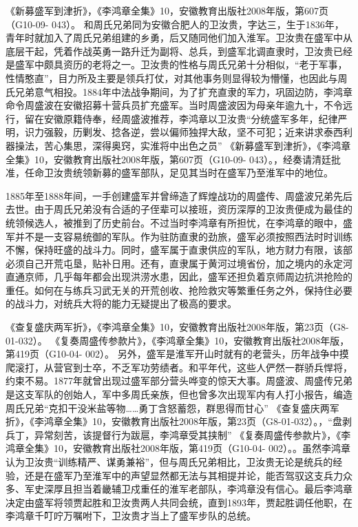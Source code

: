 \documentclass[12pt,UTF8]{ctexbook}
\begin{document}
《新募盛军到津折》，《李鸿章全集》10，安徽教育出版社2008年版，第607页（G10-09- 043）。
和周氏兄弟同为安徽合肥人的卫汝贵，字达三，生于1836年，青年时就加入了周氏兄弟组建的乡勇，后又随同他们加入淮军。卫汝贵在盛军中从底层干起，凭着作战英勇一路升迁为副将、总兵，到盛军北调直隶时，卫汝贵已经是盛军中颇具资历的老将之一。卫汝贵的性格与周氏兄弟十分相似，“老于军事，性情憨直”，目力所及主要是领兵打仗，对其他事务则显得较为懵懂，也因此与周氏兄弟意气相投。1884年中法战争期间，为了扩充直隶的军力，巩固边防，李鸿章命令周盛波在安徽招募十营兵员扩充盛军。当时周盛波因为母亲年逾九十，不令远行，留在安徽原籍侍奉，经周盛波推荐，李鸿章以卫汝贵“分统盛军多年，纪律严明，识力强毅，历剿发、捻各逆，尝以偏师独捍大敌，坚不可犯；近来讲求泰西利器操法，苦心集思，深得奥窍，实淮将中出色之员” 《新募盛军到津折》，《李鸿章全集》10，安徽教育出版社2008年版，第607页（G10-09- 043）。，经奏请清廷批准，任命卫汝贵统领新募的盛军部队，足见其当时在盛军乃至淮军中的地位。

1885年至1888年间，一手创建盛军并曾缔造了辉煌战功的周盛传、周盛波兄弟先后去世。由于周氏兄弟没有合适的子侄辈可以接班，资历深厚的卫汝贵便成为最佳的统领候选人，被推到了历史前台。不过当时李鸿章有所担忧，在李鸿章的眼中，盛军并不是一支容易统御的军队。作为驻防直隶的劲旅，盛军必须按照西法时时训练不懈，保持旺盛的战斗力。同时，盛军属于直隶供应的军队，地方财力有限，该部必须自己开荒屯垦，贴补日用。还有，直隶属于黄河过境省份，加之境内的永定河直通京师，几乎每年都会出现洪涝水患，因此，盛军还担负着京师周边抗洪抢险的重任。如何在与练兵习武无关的开荒创收、抢险救灾等繁重任务之外，保持住必要的战斗力，对统兵大将的能力无疑提出了极高的要求。

《查复盛庆两军折》，《李鸿章全集》10，安徽教育出版社2008年版，第23页（G8-01-032）。
《复奏周盛传参款片》，《李鸿章全集》10，安徽教育出版社2008年版，第419页（G10-04- 002）。
另外，盛军是淮军开山时就有的老营头，历年战争中摸爬滚打，从营官到士卒，不乏军功劳绩者。和平年代，这些人俨然一群骄兵悍将，约束不易。1877年就曾出现过盛军部分营头哗变的惊天大事。周盛波、周盛传兄弟是这支军队的创始人，军中多周氏亲族，但也曾多次出现军内有人打小报告，编造周氏兄弟“克扣干没米盐等物……勇丁含怒蓄怨，群思得而甘心” 《查复盛庆两军折》，《李鸿章全集》10，安徽教育出版社2008年版，第23页（G8-01-032）。，“盘剥兵丁，异常刻苦，该提督行为跋扈，李鸿章受其挟制” 《复奏周盛传参款片》，《李鸿章全集》10，安徽教育出版社2008年版，第419页（G10-04- 002）。。虽然李鸿章认为卫汝贵“训练精严、谋勇兼裕”，但与周氏兄弟相比，卫汝贵无论是统兵的经验，还是在盛军乃至淮军中的声望显然都无法与其相提并论，能否驾驭这支兵力众多、军史深厚且担当着畿辅卫戍重任的淮军老部队，李鸿章没有信心。最后李鸿章决定由盛军将领贾起胜和卫汝贵两人共同会统，直到1893年，贾起胜调任他职，在李鸿章千叮咛万嘱咐下，卫汝贵才当上了盛军步队的总统。
\end{document}
